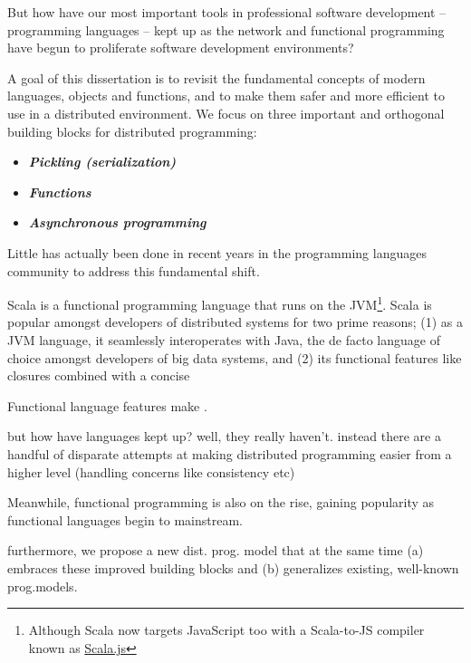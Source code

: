 
But how have our most important tools in professional software development --
programming languages -- kept up as the network and functional programming have
begun to proliferate software development environments?

A goal of this dissertation is to revisit the fundamental concepts of modern
languages, objects and functions, and to make them safer and more efficient to
use in a distributed environment. We focus on three important and orthogonal
building blocks for distributed programming:


\begin{itemize}
  \item {\bf \em Pickling (serialization)}
  \item {\bf \em Functions}
  \item {\bf \em Asynchronous programming}
\end{itemize}



Little has actually been done in recent years in the programming languages
community to address this fundamental shift.

Scala is a functional programming language that runs on the
JVM\footnote{Although Scala now targets JavaScript too with a Scala-to-JS
compiler known as \href{http://www.scala-js.org/}{Scala.js}}. Scala is popular
amongst developers of distributed systems for two prime reasons; (1) as a JVM
language, it seamlessly interoperates with Java, the de facto language of choice
amongst developers of big data systems, and (2) its functional features like
closures combined with a concise 

Functional language features make .


but how have languages kept up? well, they really haven't. instead there are a
handful of disparate attempts at making distributed programming easier from a
higher level (handling concerns like consistency etc)

Meanwhile, functional programming is also on the rise, gaining popularity as
functional languages begin to mainstream.


furthermore, we propose a new dist. prog. model that at the same time (a)
embraces these improved building blocks and (b) generalizes existing, well-known
prog.models.

